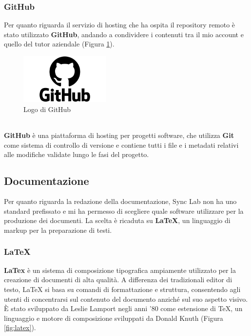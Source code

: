 \subsubsection{GitHub}
Per quanto riguarda il servizio di hosting che ha ospita il \gls{repository}{} remoto è stato utilizzato \textbf{GitHub}, andando a condividere 
i contenuti tra il mio account e quello del tutor aziendale (Figura \ref{fig:github}).\\
\begin{figure}[h]
    \centering
    \includegraphics[width=0.4\textwidth]{images/tecnologie/logo_github.png}
    \caption{Logo di GitHub}
    \label{fig:github}
\end{figure}
\\
\textbf{GitHub} è una piattaforma di hosting per progetti software, che utilizza \textbf{Git} come sistema di controllo di versione e contiene tutti 
i file e i \gls{metadati}{} relativi alle modifiche validate lungo le fasi del progetto.\\
\pagebreak
\subsection{Documentazione}
Per quanto riguarda la redazione della documentazione, Sync Lab non ha uno standard prefissato e mi ha permesso di scegliere quale software utilizzare per la 
produzione dei documenti. La scelta è ricaduta su \textbf{LaTeX}, un linguaggio di markup per la preparazione di testi.\\
\subsubsection{LaTeX}
\textbf{LaTex}  è un sistema di composizione tipografica ampiamente utilizzato per la creazione di documenti di alta qualità. A differenza dei tradizionali editor di testo, LaTeX si basa su comandi di formattazione e struttura, consentendo agli utenti di concentrarsi sul contenuto del documento anziché sul suo aspetto visivo.\\
È stato sviluppato da Leslie Lamport negli anni '80 come estensione di TeX, un linguaggio e motore di composizione sviluppati da Donald Knuth (Figura \ref{fig:latex}).

